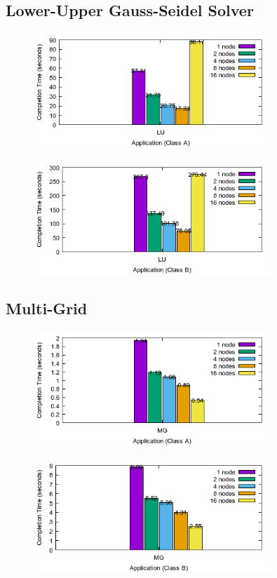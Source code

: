 \documentclass[a4paper]{article}
\begin{document}
\subsection{Lower-Upper Gauss-Seidel Solver}

\begin{figure}[H]
\centering
\includegraphics[width=0.8\textwidth]{figures/LUvA.png}
\caption{\label{fig:LUvA}}
\end{figure}

\begin{figure}[H]
\centering
\includegraphics[width=0.8\textwidth]{figures/LUvB.png}
\caption{\label{fig:LUvB}}
\end{figure}

\subsection{Multi-Grid}

\begin{figure}[H]
\centering
\includegraphics[width=0.8\textwidth]{figures/MGvA.png}
\caption{\label{fig:MGvA}}
\end{figure}

\begin{figure}[H]
\centering
\includegraphics[width=0.8\textwidth]{figures/MGvB.png}
\caption{\label{fig:MGvB}}
\end{figure}



\end{document}
